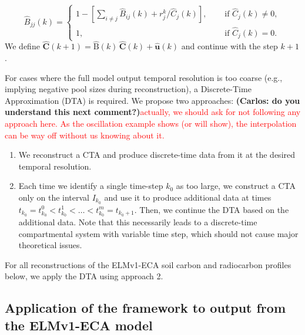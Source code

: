 \documentclass[11pt,a4paper]{article}
\newcommand{\red}[1]{\textcolor{red}{#1}}
\renewcommand{\vec}[1]{\mathbf{#1}}
\newcommand{\tens}[1]{\mathrm{#1}}
\newcommand{\suml}{\sum\limits}
\begin{document}
    \begin{equation*}
        \widehat{B}_{jj}(k) = 
        \begin{cases}
            1-\left[\suml_{i\neq j}\widehat{B}_{ij}(k)+r^k_j/\widehat{C}_j(k)\right],\quad &\text{ if }\widehat{C}_j(k)\neq0,\\
            1, &\text{ if }\widehat{C}_j(k)=0.
        \end{cases}
    \end{equation*}
    We define $\widehat{\vec{C}}(k+1)=\widehat{\tens{B}}(k)\,\widehat{\vec{C}}(k)+\widehat{\vec{u}}(k)$ and continue with the step $k+1$.
    
    For cases where the full model output temporal resolution is too coarse (e.g., implying negative pool sizes during reconstruction), a Discrete-Time Approximation (DTA) is required. We propose two approaches:
    \textbf{(Carlos: do you understand this next comment?)}\red{actually, we should ask for not following any approach here. As the oscillation example shows (or will show), the interpolation can be way off without us knowing about it.}
    
    \begin{enumerate}[(1)]
        \item We reconstruct a CTA and produce discrete-time data from it at the desired temporal resolution.
        \item Each time we identify a single time-step $k_0$ as too large, we construct a CTA only on the interval $I_{k_0}$ and use it to produce additional data at times $t_{k_0}=t_{k_0}^0<t_{k_0}^1<\ldots<t_{k_0}^m=t_{k_0+1}$.
        Then, we continue the DTA based on the additional data.
        Note that this necessarily leads to a discrete-time compartmental system with variable time step, which should not cause major theoretical issues.
    \end{enumerate}

For all reconstructions of the ELMv1-ECA soil carbon and radiocarbon profiles below, we apply the DTA using approach 2.

\subsection{Application of the framework to output from the ELMv1-ECA model}
   
\end{document}
